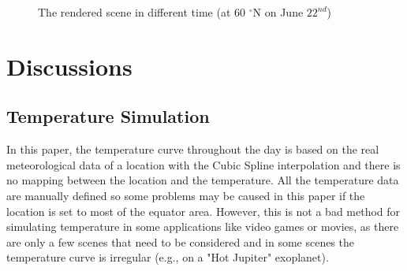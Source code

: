 \documentclass{article}
\begin{document}
\begin{figure}[h]
  \hfill
  \hfill

  \caption{The rendered scene in different time (at 60 $^{\circ}$N on June \(22^{nd}\))}
  \label{fig:L60N}
\end{figure}

\section{Discussions}

\subsection {Temperature Simulation}
In this paper, the temperature curve throughout the day is based on the real meteorological data of a location with the Cubic Spline 
interpolation and there is no mapping between the location and the temperature. All the temperature data are manually defined so some 
problems may be caused in this paper if the location is set to most of the equator area. However, this is not a bad method for 
simulating temperature in some applications like video games or movies, as there are only a few scenes that need to be considered and 
in some scenes the temperature curve is irregular (e.g., on a "Hot Jupiter" exoplanet).
\end{document}
